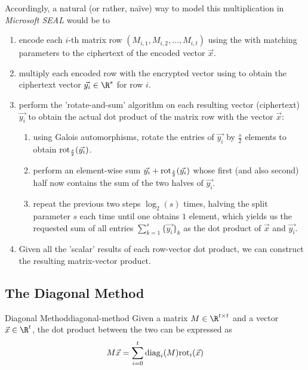 Accordingly, a natural (or rather, naïve) way to model this multiplication in \textit{Microsoft SEAL}
would be to
\begin{enumerate}
  \item encode each $i$-th matrix row $(M_{i,1}, M_{i,2}, ..., M_{i,t})$ using the 
        with matching parameters to the ciphertext of the encoded vector $\vec{x}$.
  \item multiply each encoded row with the encrypted vector using 
        to obtain the ciphertext vector $\vec{y_i} \in \R^s$ for row $i$.
  \item perform the 'rotate-and-sum' algorithm \parencite{2018-gazelle} on each
        resulting vector (ciphertext) $\vec{y_i}$ to obtain the actual dot product
        of the matrix row with the vector $\vec{x}$:
        \begin{enumerate}
          \item using Galois automorphisms, rotate the entries of $\vec{y_i}$ by $\frac{s}{2}$ elements
                to obtain $\mathrm{rot}_{\frac{s}{2}}(\vec{y_i})$.
          \item perform an element-wise sum $\vec{y_i} + \mathrm{rot}_{\frac{s}{2}}(\vec{y_i})$
                whose first (and also second) half now contains the sum of the two halves of $\vec{y_i}$.
          \item repeat the previous two steps $\log_2(s)$ times, halving the
                split parameter $s$ each time until one obtains $1$ element,
                which yields us the requested sum of all entries $\sum_{k=1}^s \{\vec{y_i}\}_k$
                as the dot product of $\vec{x}$ and $\vec{y_i}$.
        \end{enumerate}
  \item Given all the 'scalar' results of each row-vector dot product,
        we can construct the resulting matrix-vector product.
\end{enumerate}

\subsection{The Diagonal Method}
\begin{theorem}{Diagonal Method}{diagonal-method}
  Given a matrix $M \in \R^{t \times t}$ and a vector $\vec{x} \in \R^t$,
  the dot product between the two can be expressed as
  \begin{equation}
    M \vec{x} = \sum_{i=0}^t \mathrm{diag}_i(M) \mathrm{rot}_i(\vec{x})
  \end{equation}
\end{theorem}

